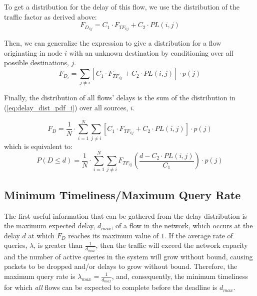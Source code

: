 To get a distribution for the delay of this flow, we use the distribution of the traffic factor as derived above:
\begin{equation}
	F_{D_{i | j}} = C_1 \cdot F_{TF_{i | j}} + C_2 \cdot PL(i,j)
\end{equation}

Then, we can generalize the expression to give a distribution for a flow originating in node $i$ with an unknown destination by conditioning over all possible destinations, $j$.
\begin{equation}
\label{eq:delay_dist_pdf_i}
	F_{D_i} = \sum\limits_{j \neq i} [ C_1 \cdot F_{TF_{i | j}} + C_2 \cdot PL(i,j)] \cdot p(j)
\end{equation}

Finally, the distribution of all flows' delays is the sum of the distribution in (\ref{eq:delay_dist_pdf_i}) over all sources, $i$.

\begin{equation}
\label{eq:delay_dist_cdf}
	F_{D} = \frac{1}{N} \cdot \sum\limits_{i = 1}^N \sum\limits_{j \neq i} [ C_1 \cdot F_{TF_{i | j}} + C_2 \cdot PL(i,j)] \cdot p(j)
\end{equation}
which is equivalent to:
\begin{equation}
	P(D \leq d) = \frac{1}{N} \cdot \sum\limits_{i = 1}^N \sum\limits_{j \neq i} F_{TF_{i | j}}( \frac{d - C_2 \cdot PL(i,j)}{C_1} ) \cdot p(j)
\end{equation}

\subsection{Minimum Timeliness/Maximum Query Rate}

The first useful information that can be gathered from the delay distribution is the maximum expected delay, $d_{max}$, of a flow in the network, which occurs at the delay $d$ at which $F_{D}$ reaches its maximum value of $1$.  If the average rate of queries, $\lambda$, is greater than $\frac{1}{d_{max}}$, then the traffic will exceed the network capacity and the number of active queries in the system will grow without bound, causing packets to be dropped and/or delays to grow without bound.  Therefore, the maximum query rate is $\lambda_{max} = \frac{1}{d_{max}}$, and, consequently, the minimum timeliness for which \emph{all} flows can be expected to complete before the deadline is $d_{max}$.

